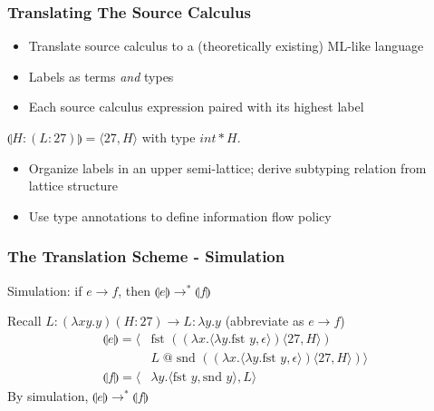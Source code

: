 \documentclass{beamer}
\begin{document}
\begin{frame}
  \frametitle{Translating The Source Calculus}
  \begin{itemize}
    \item Translate source calculus to a (theoretically existing) ML-like
          language
    \pause
    \item Labels as terms \emph{and} types
    \pause
    \item Each source calculus expression paired with its highest label
  \end{itemize}
  \pause
  \begin{example}
    $\llparenthesis H : (L : 27) \rrparenthesis = \langle 27, H \rangle$ with
    type $int * H$.
  \end{example}
  \pause
  \begin{itemize}
    \item Organize labels in an upper semi-lattice; derive subtyping relation
          from lattice structure
    \pause
    \item Use type annotations to define information flow policy
  \end{itemize}
\end{frame}
\begin{frame}
  \frametitle{The Translation Scheme - Simulation}
  \begin{theorem}
    Simulation: if $e \rightarrow f$,
                then $\llparenthesis e \rrparenthesis \rightarrow^*
                       \llparenthesis f \rrparenthesis$
  \end{theorem}
  \begin{example}
    Recall $L : (\lambda x y. y) (H : 27) \rightarrow L : \lambda y. y$
           (abbreviate as $e \rightarrow f$)
   \begin{align*}
     \llparenthesis e \rrparenthesis =
       \langle & \text{fst } ((\lambda x. \langle \lambda y. \text{fst } y,
                                                  \epsilon\rangle)
                              \langle 27, H \rangle)  \\
               & L\; @\; \text{snd } ((\lambda x. \langle \lambda y.
                                                     \text{fst } y,
                                                          \epsilon\rangle)
                          \langle 27, H \rangle) \rangle\\
           \llparenthesis f \rrparenthesis =
                  \langle & \lambda y. \langle \text{fst }y,
                            \text{snd }y \rangle , L \rangle
   \end{align*}
   By simulation, $\llparenthesis e \rrparenthesis \rightarrow^*
                   \llparenthesis f \rrparenthesis$
  \end{example}
\end{frame}
\end{document}

